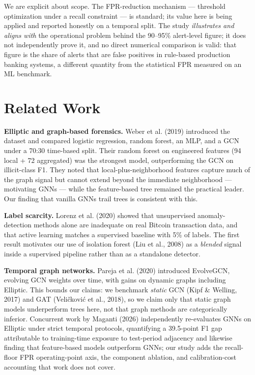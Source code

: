 \documentclass[11pt]{article}
\begin{document}
We are explicit about scope. The FPR-reduction mechanism --- threshold optimization under a recall constraint --- is standard; its value here is being applied and reported honestly on a temporal split. The study \emph{illustrates and aligns with} the operational problem behind the 90--95\% alert-level figure; it does not independently prove it, and no direct numerical comparison is valid: that figure is the share of alerts that are false positives in rule-based production banking systems, a different quantity from the statistical FPR measured on an ML benchmark.

\section{Related Work}

\textbf{Elliptic and graph-based forensics.} Weber et al. (2019) introduced the dataset and compared logistic regression, random forest, an MLP, and a GCN under a 70:30 time-based split. Their random forest on engineered features (94 local + 72 aggregated) was the strongest model, outperforming the GCN on illicit-class F1. They noted that local-plus-neighborhood features capture much of the graph signal but cannot extend beyond the immediate neighborhood --- motivating GNNs --- while the feature-based tree remained the practical leader. Our finding that vanilla GNNs trail trees is consistent with this.

\textbf{Label scarcity.} Lorenz et al. (2020) showed that unsupervised anomaly-detection methods alone are inadequate on real Bitcoin transaction data, and that active learning matches a supervised baseline with 5\% of labels. The first result motivates our use of isolation forest (Liu et al., 2008) as a \emph{blended} signal inside a supervised pipeline rather than as a standalone detector.

\textbf{Temporal graph networks.} Pareja et al. (2020) introduced EvolveGCN, evolving GCN weights over time, with gains on dynamic graphs including Elliptic. This bounds our claims: we benchmark \emph{static} GCN (Kipf \& Welling, 2017) and GAT (Veli\v{c}kovi\'{c} et al., 2018), so we claim only that static graph models underperform trees here, not that graph methods are categorically inferior. Concurrent work by Maganti (2026) independently re-evaluates GNNs on Elliptic under strict temporal protocols, quantifying a 39.5-point F1 gap attributable to training-time exposure to test-period adjacency and likewise finding that feature-based models outperform GNNs; our study adds the recall-floor FPR operating-point axis, the component ablation, and calibration-cost accounting that work does not cover.
\end{document}
